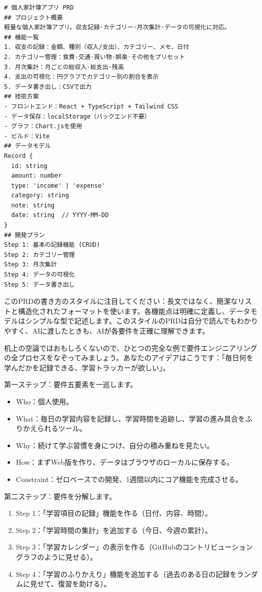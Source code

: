 \begin{lstlisting}
# 個人家計簿アプリ PRD
## プロジェクト概要
軽量な個人家計簿アプリ。収支記録·カテゴリー·月次集計·データの可視化に対応。
## 機能一覧
1. 収支の記録：金額、種別（収入/支出）、カテゴリー、メモ、日付
2. カテゴリー管理：食費·交通·買い物·娯楽·その他をプリセット
3. 月次集計：月ごとの総収入·総支出·残高
4. 支出の可視化：円グラフでカテゴリー別の割合を表示
5. データ書き出し：CSVで出力
## 技術方案
- フロントエンド：React + TypeScript + Tailwind CSS
- データ保存：localStorage（バックエンド不要）
- グラフ：Chart.jsを使用
- ビルド：Vite
## データモデル
Record {
  id: string
  amount: number
  type: 'income' | 'expense'
  category: string
  note: string
  date: string  // YYYY-MM-DD
}
## 開発プラン
Step 1: 基本の記録機能 (CRUD)
Step 2: カテゴリー管理
Step 3: 月次集計
Step 4: データの可視化
Step 5: データ書き出し
\end{lstlisting}

このPRDの書き方のスタイルに注目してください：長文ではなく、簡潔なリストと構造化されたフォーマットを使います。各機能点は明確に定義し、データモデルはシンプルな型で記述します。このスタイルのPRDは自分で読んでもわかりやすく、AIに渡したときも、AIが各要件を正確に理解できます。


机上の空論ではおもしろくないので、ひとつの完全な例で要件エンジニアリングの全プロセスをなぞってみましょう。あなたのアイデアはこうです：「毎日何を学んだかを記録できる、学習トラッカーが欲しい」。

第一ステップ：要件五要素を一巡します。

\begin{itemize}
  \item Who：個人使用。
  \item What：毎日の学習内容を記録し、学習時間を追跡し、学習の進み具合をふりかえられるツール。
  \item Why：続けて学ぶ習慣を身につけ、自分の積み重ねを見たい。
  \item How：まずWeb版を作り、データはブラウザのローカルに保存する。
  \item Constraint：ゼロベースでの開発、1週間以内にコア機能を完成させる。
\end{itemize}

第二ステップ：要件を分解します。

\begin{enumerate}
  \item Step 1：「学習項目の記録」機能を作る（日付、内容、時間）。
  \item Step 2：「学習時間の集計」を追加する（今日、今週の累計）。
  \item Step 3：「学習カレンダー」の表示を作る（GitHubのコントリビューショングラフのように見せる）。
  \item Step 4：「学習のふりかえり」機能を追加する（過去のある日の記録をランダムに見せて、復習を助ける）。
\end{enumerate}

